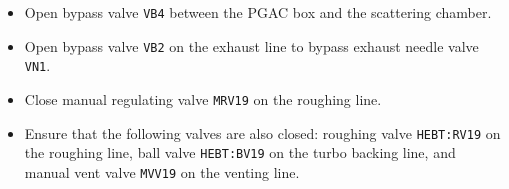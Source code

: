 \begin{itemize}
\setlength{\itemsep}{0pt}
\setlength{\parskip}{0pt}
\setlength{\parsep}{0pt}%
\item Open bypass valve \texttt{VB4} between the PGAC box and the scattering chamber.
\item Open bypass valve \texttt{VB2} on the exhaust line to bypass exhaust needle valve \texttt{VN1}.
\item Close manual regulating valve \texttt{MRV19} on the roughing line.
\item Ensure that the following valves are also closed: roughing valve \texttt{HEBT:RV19} on the roughing line, ball valve \texttt{HEBT:BV19} on the turbo backing line, and manual vent valve \texttt{MVV19} on the venting line.


\end{itemize}
